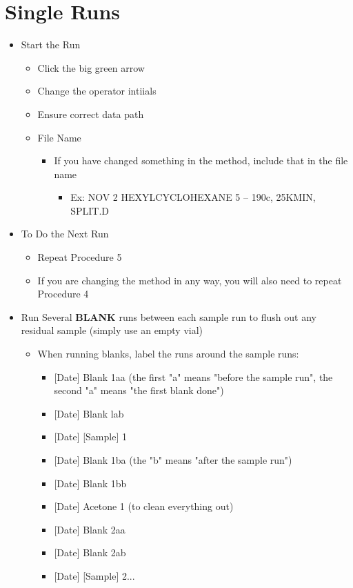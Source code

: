 \documentclass[letterpaper,11pt]{article}
\begin{document}
\section{Single Runs}
	\begin{itemize}
	\item Start the Run
    	\begin{itemize}
    	\item Click the big green arrow
        \item Change the operator intiials
        \item Ensure correct data path
        \item File Name
        	\begin{itemize}
        	\item If you have changed something in the method, include that in the file name
            	\begin{itemize}
            	\item Ex: NOV 2 HEXYLCYCLOHEXANE 5 	-- 190c, 25KMIN, SPLIT.D
            	\end{itemize}
        	\end{itemize}
    	\end{itemize}
        \item To Do the Next Run
        	\begin{itemize}
        	\item Repeat Procedure 5
            \item If you are changing the method in any way, you will also need to repeat Procedure 4
        	\end{itemize}
        \item Run Several \textbf{BLANK} runs between each sample run to flush out any residual sample (simply use an empty vial)
        	\begin{itemize}
        	\item When running blanks, label the runs around the sample runs:
            	\begin{itemize}
            	\item{} [Date] Blank 1aa (the first "a" means "before the sample run", the second "a" means "the first blank done")
                \item{} [Date] Blank lab
                \item{} [Date] [Sample] 1
                \item{} [Date] Blank 1ba (the "b" means "after the sample run")
                \item{} [Date] Blank 1bb
                \item{} [Date] Acetone 1 (to clean everything out)
                \item{} [Date] Blank 2aa
                \item{} [Date] Blank 2ab
                \item{} [Date] [Sample] 2...
            	\end{itemize}
        	\end{itemize}
	\end{itemize}
\end{document}
